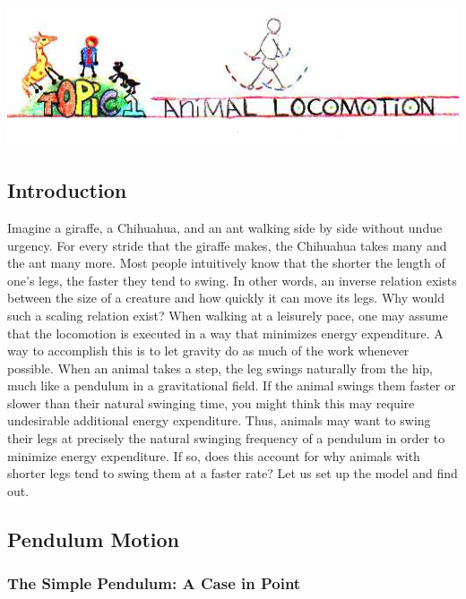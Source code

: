 \setcounter{chapter}{1}
\setcounter{section}{0}
\setcounter{figure}{0}
\setcounter{equation}{0}
\setcounter{table}{0}
\chapter*{\includegraphics[width=\textwidth]{./figures/Topic1/Topic1.jpg}}

\section{Introduction}

Imagine a giraffe, a Chihuahua, and an ant walking side by side without undue urgency. For every stride that the giraffe makes, the Chihuahua takes many and the ant many more. Most people intuitively know that the shorter the length of one’s legs, the faster they tend to swing. In other words, an inverse relation exists between the size of a creature and how quickly it can move its legs. Why would such a scaling relation exist?  
When walking at a leisurely pace, one may assume that the locomotion is executed in a way that minimizes energy expenditure.  A way to accomplish this is to let gravity do as much of the work whenever possible.  When an animal takes a step, the leg swings naturally from the hip, much like a pendulum in a gravitational field.  If the animal swings them faster or slower than their natural swinging time, you might think this may require undesirable additional energy expenditure. Thus, animals may want to swing their legs at precisely the natural swinging frequency of a pendulum in order to minimize energy expenditure. If so, does this account for why animals with shorter legs tend to swing them at a faster rate?  Let us set up the model and find out.

\section{Pendulum Motion}

\subsection{The Simple Pendulum: A Case in Point}

